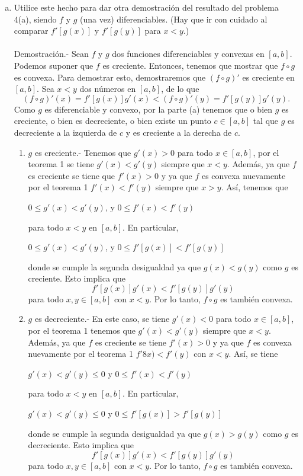 \begin{enumerate}[\bfseries 1.]
\begin{enumerate}[(a)]
	    \item Utilice este hecho para dar otra demostración del resultado del problema 4(a), siendo $f$ y $g$ (una vez) diferenciables. (Hay que ir con cuidado al comparar $f'[g(x)]$ y $f'[g(y)]$ para $x<y$.)\\\\
		Demostración.-\; Sean $f$ y $g$ dos funciones diferenciables y convexas en $[a,b]$. Podemos suponer que $f$ es creciente. Entonces, tenemos que mostrar que $f\circ g$ es convexa. Para demostrar esto, demostraremos que $(f\circ g)'$ es creciente en $[a,b]$. Sea $x<y$ dos números en $[a,b]$, de lo que 
		$$(f\circ g)'(x)=f'\left[g(x)\right]g'(x) < (f\circ g)'(y) = f'\left[g(y)\right]g'(y).$$
		Como $g$ es diferenciable y convexo, por la parte (a) tenemos que o bien $g$ es creciente, o bien es decreciente, o bien existe un punto $c\in [a,b]$ tal que $g$ es decreciente a la izquierda de $c$ y es creciente a la derecha de $c$.
		\begin{enumerate}
		    \item $g$ es creciente.- Tenemos que $g'(x)>0$ para todo $x\in[a,b]$, por el teorema 1 se tiene $g'(x)<g'(y)$ siempre que $x<y.$ Además, ya que $f$ es creciente se tiene que $f'(x)>0$ y ya que $f$ es convexa nuevamente por el teorema 1 $f'(x)<f'(y)$ siempre que $x>y$. Así, tenemos que
		    \begin{center}
			$0\leq g'(x)<g'(y)$, \quad y \quad $0\leq f'(x)<f'(y)$
		    \end{center}
		    para todo $x<y$ en $[a,b]$. En particular,  
		    \begin{center}
			$0\leq g'(x)<g'(y)$, \quad y \quad $0\leq f'\left[g(x)\right]<f'\left[g(y)\right]$
		    \end{center}
		    donde se cumple la segunda desigualdad ya que $g(x)<g(y)$ como $g$ es creciente. Esto implica que
		    $$f'\left[g(x)\right]g'(x)<f'\left[g(y)\right]g'(y)$$
		    para todo $x,y\in [a,b]$ con $x<y$. Por lo tanto, $f\circ g$ es también convexa.\\
		    
		    \item $g$ es decreciente.- En este caso, se tiene $g'(x)<0$ para todo $x\in [a,b]$, por el teorema 1 tenemos que $g'(x)<g'(y)$ siempre que $x<y$. Además, ya que $f$ es creciente se tiene $f'(x)>0$ y ya que $f$ es convexa nuevamente por el teorema 1 $f'8x)<f'(y)$ con $x<y$. Así, se tiene
		    \begin{center}
			$g'(x)<g'(y)\leq 0$ y $0\leq f'(x)<f'(y)$
		    \end{center}
		    para todo $x<y$ en $[a,b]$. En particular,
		    \begin{center}
			$g'(x)<g'(y)\leq 0$ y $0\leq f'\left[g(x)\right]>f'\left[g(y)\right]$
		    \end{center}
		    donde se cumple la segunda desigualdad ya que $g(x)>g(y)$ como $g$ es decreciente. Esto implica que
		    $$f'\left[g(x)\right]g'(x)<f'\left[g(y)\right]g'(y)$$
		    para todo $x,y\in [a,b]$ con $x<y$. Por lo tanto, $f\circ g$ es también convexa.\\


\end{enumerate}
\end{enumerate}
\end{enumerate}
